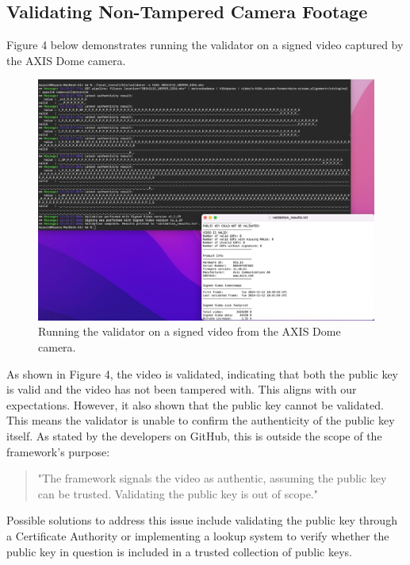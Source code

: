 \documentclass[a4paper,12pt]{article}
\begin{document}
\subsection{Validating Non-Tampered Camera Footage}
Figure 4 below demonstrates running the validator on a signed video captured by the AXIS Dome camera.

\begin{figure}[h!]
    \centering
    \includegraphics[width=1\textwidth]{pic.jpeg}
    \caption{Running the validator on a signed video from the AXIS Dome camera.}
    \label{fig:axis-dome-example}
\end{figure}

As shown in Figure 4, the video is validated, indicating that both the public key is valid and the video has not been tampered with. This aligns with our expectations. However, it also shown that the public key cannot be validated. This means the validator is unable to confirm the authenticity of the public key itself. As stated by the developers on GitHub, this is outside the scope of the framework's purpose: \\

\begin{quote}
    "The framework signals the video as authentic, assuming the public key can be trusted. Validating the public key is out of scope."
\end{quote}

Possible solutions to address this issue include validating the public key through a Certificate Authority or implementing a lookup system to verify whether the public key in question is included in a trusted collection of public keys.
\end{document}
